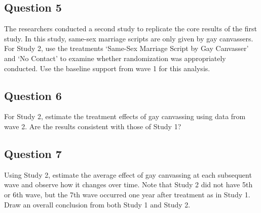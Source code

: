 \documentclass[]{article}
\begin{document}
\subsection{Question 5}\label{question-5}

The researchers conducted a second study to replicate the core results
of the first study. In this study, same-sex marriage scripts are only
given by gay canvassers. For Study 2, use the treatments `Same-Sex
Marriage Script by Gay Canvasser' and `No Contact' to examine whether
randomization was appropriately conducted. Use the baseline support from
wave 1 for this analysis.

\subsection{Question 6}\label{question-6}

For Study 2, estimate the treatment effects of gay canvassing using data
from wave 2. Are the results consistent with those of Study 1?

\subsection{Question 7}\label{question-7}

Using Study 2, estimate the average effect of gay canvassing at each
subsequent wave and observe how it changes over time. Note that Study 2
did not have 5th or 6th wave, but the 7th wave occurred one year after
treatment as in Study 1. Draw an overall conclusion from both Study 1
and Study 2.
\end{document}
